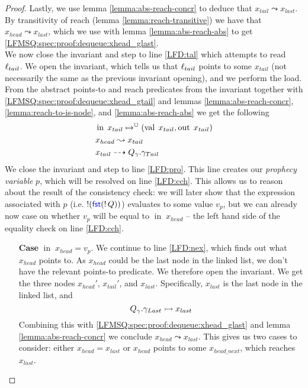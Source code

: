 \documentclass[a4paper, 11pt]{report}
\newcommand{\nIn}[1]{\operatorname{in} \; #1}
\newcommand{\nVal}[1]{\operatorname{val} \; #1}
\newcommand{\nOut}[1]{\operatorname{out} \; #1}
\newcommand{\Qg}{Q_\gname}
\newcommand{\isNode}[1]{\nIn{#1} \mapsto^{\persistently} (\nVal{#1}, \nOut{#1})}
\newcommand{\reach}[2]{#1 \leadsto #2}
\newcommand{\ar}[2]{#1 \dashrightarrow #2}
\newcommand{\ap}[2]{#1 \rightarrowtail #2}
\begin{document}
\begin{proof}
  Lastly, we use lemma \ref{lemma:abs-reach-concr} to deduce that $\reach{x_{tail}}{x_{last}}$. By transitivity of reach (lemma \ref{lemma:reach-transitive}) we have that $\reach{x_{head}}{x_{last}}$, which we use with lemma \ref{lemma:abs-reach-abs} to get \ref{LFMSQ:spec:proof:dequeue:xhead_glast}.\\
  We now close the invariant and step to line \ref{LFD:tal} which attempts to read $\ell_{tail}$. We open the invariant, which tells us that $\ell_{tail}$ points to some $x_{tail}$ (not necessarily the same as the previous invariant opening), and we perform the load. From the abstract points-to and reach predicates from the invariant together with \ref{LFMSQ:spec:proof:dequeue:xhead_gtail} and lemmas \ref{lemma:abs-reach-concr}, \ref{lemma:reach-to-is-node}, and \ref{lemma:abs-reach-abs} we get the following
  \begin{align}
    &\isNode{x_{tail}}\label{LFMSQ:spec:proof:dequeue:xtail_node}\\
    &\reach{x_{head}}{x_{tail}}\label{LFMSQ:spec:proof:dequeue:xhead_r_xtail}\\
    &\ar{x_{tail}}{\Qg.\gname_{Tail}}\label{LFMSQ:spec:proof:dequeue:xtail_gtail}\\
  \end{align}
  We close the invariant and step to line \ref{LFD:pro}. This line creates our \textit{prophecy variable} $p$, which will be resolved on line \ref{LFD:cch}. This allows us to reason about the result of the consistency check: we will later show that the expression associated with $p$ (i.e. $\mathop{!}(\operatorname{\textsf{\color{blue} fst}} (\mathop{!} Q))$) evaluates to some value $v_p$, but we can already now case on whether $v_p$ will be equal to $\nIn{x_{head}}$ -- the left hand side of the equality check on line \ref{LFD:cch}.
  \begin{itemize}
    \item[\textbf{Case}] $\nIn{x_{head}} = v_p$.
    We continue to line \ref{LFD:nex}, which finds out what $x_{head}$ points to. As $x_{head}$ could be the last node in the linked list, we don't have the relevant points-to predicate. We therefore open the invariant. We get the three nodes $x_{head}'$, $x_{tail}'$, and $x_{last}$. Specifically, $x_{last}$ is the last node in the linked list, and 
    \begin{equation}\label{LFMSQ:spec:proof:dequeue:glast_xlast}
      \ap{\Qg.\gname_{Last}}{x_{last}}
    \end{equation}
    Combining this with \ref{LFMSQ:spec:proof:dequeue:xhead_glast} and lemma \ref{lemma:abs-reach-concr} we conclude $\reach{x_{head}}{x_{last}}$. This gives us two cases to consider: either $x_{head} = x_{last}$ or $x_{head}$ points to some $x_{head\_next}$, which reaches $x_{last}$.

\end{itemize}
\end{proof}
\end{document}
